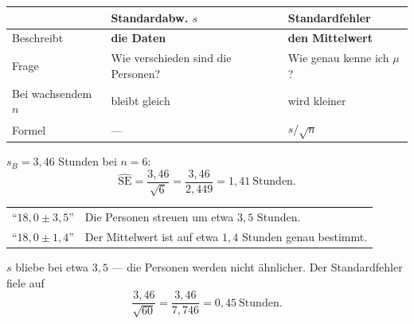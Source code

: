 \begin{warnung}
\begin{center}
{\small
\renewcommand{\arraystretch}{1.55}
\begin{tabular}{@{}P{2.2cm}P{3.0cm}P{3.2cm}@{}}
\toprule
& \textbf{Standardabw. $s$} & \textbf{Standardfehler}\\
\midrule
Beschreibt & \textbf{die Daten} & \textbf{den Mittelwert}\\
Frage & Wie verschieden sind die Personen? & Wie genau kenne ich $\mu$?\\
Bei wachsendem $n$ & bleibt gleich & \textcolor{gruen}{wird kleiner}\\
Formel & --- & $s/\sqrt n$\\
\bottomrule
\end{tabular}}
\end{center}

$s_B = 3{,}46$ Stunden bei $n = 6$:
\[ \widehat{\mathrm{SE}} = \frac{3{,}46}{\sqrt 6} = \frac{3{,}46}{2{,}449} = 1{,}41 \ \text{Stunden} . \]

\begin{center}
\renewcommand{\arraystretch}{1.45}
\begin{tabular}{@{}P{3.4cm}P{4.8cm}@{}}
\toprule
\enquote{$18{,}0 \pm 3{,}5$} & Die Personen streuen um etwa $3{,}5$ Stunden.\\
\enquote{$18{,}0 \pm 1{,}4$} & Der Mittelwert ist auf etwa $1{,}4$ Stunden genau bestimmt.\\
\bottomrule
\end{tabular}
\end{center}

$s$ bliebe bei etwa $3{,}5$ --- die Personen werden nicht ähnlicher. Der Standardfehler fiele auf
\[ \frac{3{,}46}{\sqrt{60}} = \frac{3{,}46}{7{,}746} = 0{,}45 \ \text{Stunden} . \]

\begin{center}
\begin{minipage}{0.88\textwidth}
\end{minipage}
\end{center}
\end{warnung}

